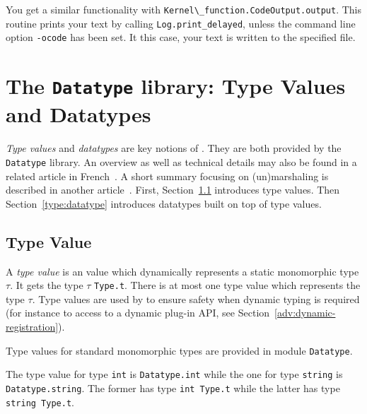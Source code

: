 %
%
You get a similar functionality with
\lstinline{Kernel\_function.CodeOutput.output}. This routine prints your
text by calling \lstinline{Log.print_delayed}, unless the command
line option \texttt{-ocode} has been set. It this case, your text is
written to the specified file.


\section{The \texttt{Datatype} library: Type Values and
  Datatypes}\label{adv:datatype}

\emph{Type values} and \emph{datatypes} are key notions of \framac. They are
both provided by the \texttt{Datatype} library. An overview as well as technical
details may also be found in a related article in
French~\cite{signoles:jfla11}. A short summary focusing on (un)marshaling is
described in another article~\cite{cuoq:ml11}. First,
Section~\ref{type:type-value} introduces type values. Then
Section~\ref{type:datatype} introduces datatypes built on top of type values.

\subsection{Type Value}\label{type:type-value}

A \emph{type value} is an \caml value which dynamically represents a static
monomorphic \caml type $\tau$. It gets the type $\tau$
\texttt{Type.t}. There is at most one type value which
represents the type $\tau$. Type values are used by \framac to ensure safety
when dynamic typing is required (for instance to access to a dynamic plug-in
API, see Section~\ref{adv:dynamic-registration}).

Type values for standard \caml monomorphic types are provided in module
\texttt{Datatype}.
\begin{example}
The type value for type \texttt{int} is
\texttt{Datatype.int} while the one for type
\texttt{string} is \texttt{Datatype.string}. The
former has type \texttt{int Type.t} while the latter has type \texttt{string
  Type.t}.
\end{example}

